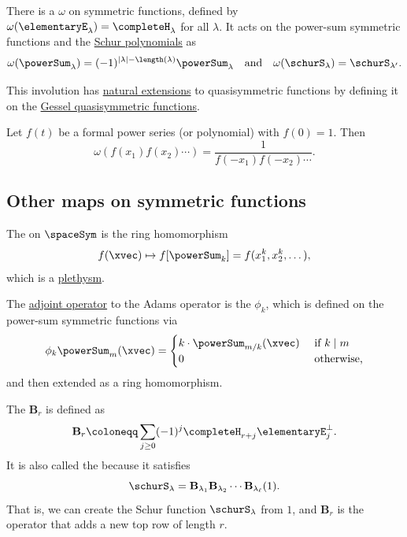There is a \label{omegaInvolutionDefinition}
$\omega$ on symmetric functions, defined by
$\omega(\elementaryE_\lambda) = \completeH_\lambda$ for all $\lambda$.
It acts on the power-sum symmetric functions and the
\hyperref[schurS]{Schur polynomials} as
\[
\omega(\powerSum_\lambda)
=
(-1)^{|\lambda|-\length(\lambda)}\powerSum_\lambda
\quad \text{and} \quad
\omega(\schurS_\lambda) = \schurS_{\lambda'}.
\]

This involution has \hyperref[gesselProperties]{natural extensions} to
quasisymmetric functions by defining it on the
\hyperref[gessel]{Gessel quasisymmetric functions}.


\begin{lemma}
Let $f(t)$ be a formal power series (or polynomial) with $f(0)=1$.
Then
\[
\omega \left( f(x_1)f(x_2) \dotsm \right) = \frac{1}{f(-x_1)f(-x_2) \dotsm}.
\]
\end{lemma}


\subsection[mapsOnSymmetricFunctions]{Other maps on symmetric functions}


\begin{definition}

The \label{adamsOperatorSymmetricFunctions}
on $\spaceSym$ is the ring homomorphism
\[
 f(\xvec) \mapsto f[ \powerSum_k ] = f(x_1^k, x_2^k, \dotsc ),
\]
which is a \hyperref[plethysm]{plethysm}.

The \hyperref[hallInnerProduct]{adjoint operator} to the Adams operator
is the \label{verschiebungOperatorSymmetricFunctions}
$\phi_k$, which is defined on the power-sum symmetric functions via
\[
 \phi_k \powerSum_m(\xvec) =
 \begin{cases}
k\cdot \powerSum_{m/k}(\xvec) & \text{ if } k \mid m \\
 0 & \text{ otherwise,}
 \end{cases}
\]
and then extended as a ring homomorphism.
\end{definition}


\begin{definition}\label{bernsteinOperator}
The  $\mathbf{B}_r$ is defined as
\[
   \mathbf{B}_r \coloneqq \sum_{j \geq 0} (-1)^j \completeH_{r+j} \elementaryE^{\perp}_j.
\]
It is also called the  because it satisfies
\[
 \schurS_{\lambda} = \mathbf{B}_{\lambda_1} \mathbf{B}_{\lambda_{2}} \dotsb \mathbf{B}_{\lambda_{\ell}}(1).
\]
That is, we can create the Schur function $\schurS_{\lambda}$ from $1$, and
$\mathbf{B}_r$ is the operator that adds a new top row of length $r$.

\end{definition}


